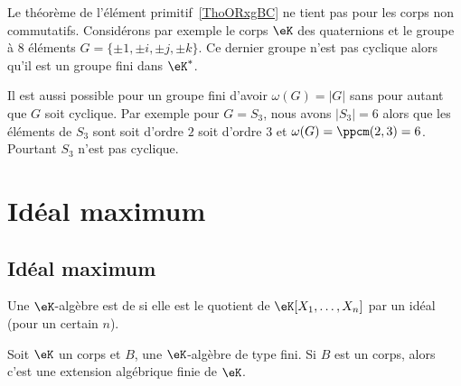 \begin{example}
    Le théorème de l'élément primitif~\ref{ThoORxgBC} ne tient pas pour les corps non commutatifs. Considérons par exemple le corps \( \eK\) des quaternions et le groupe à \( 8\) éléments \( G=\{ \pm 1,\pm i,\pm j,\pm k \}\). Ce dernier groupe n'est pas cyclique alors qu'il est un groupe fini dans \( \eK^*\).
\end{example}

\begin{example}
    Il est aussi possible pour un groupe fini d'avoir \( \omega(G)=| G |\) sans pour autant que \( G\) soit cyclique. Par exemple pour \( G=S_3\), nous avons \( | S_3 |=6\) alors que les éléments de \( S_3\) sont soit d'ordre \( 2\) soit d'ordre \( 3\) et \( \omega(G)=\ppcm(2,3)=6\). Pourtant \( S_3\) n'est pas cyclique.
\end{example}

\section{Idéal maximum}

\subsection{Idéal maximum}

\begin{definition}  \label{DefWHDdTrC}
    Une \( \eK\)-algèbre est de  si elle est le quotient de \( \eK[X_1,\ldots, X_n]\) par un idéal (pour un certain \( n\)).
\end{definition}

\begin{theorem}      \label{ThonoZyKa}
    Soit \( \eK\) un corps et \( B\), une \( \eK\)-algèbre de type fini. Si \( B\) est un corps, alors c'est une extension algébrique finie de \( \eK\).
\end{theorem}

